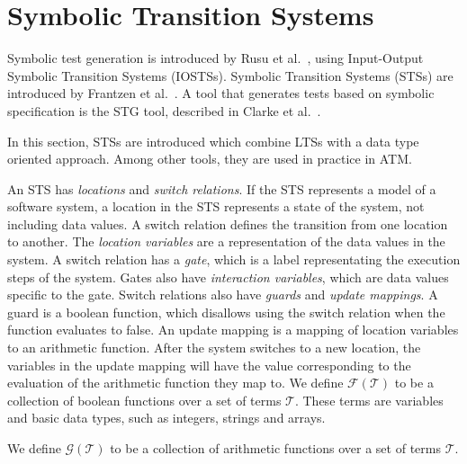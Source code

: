 \section{Symbolic Transition Systems}\label{sec:symbolic}
Symbolic test generation is introduced by Rusu et al.~\cite{rusu:symbolic}, using Input-Output Symbolic Transition Systems (IOSTSs). Symbolic Transition Systems (STSs) are introduced by Frantzen et al.~\cite{Frantzen:Symbolic}. A tool that generates tests based on symbolic specification is the STG tool, described in Clarke et al.~\cite{clarke:STG}.

In this section, STSs are introduced which combine LTSs with a data type oriented approach. Among other tools, they are used in practice in ATM.

An STS has \textit{locations} and \textit{switch relations}. If the STS represents a model of a software system, a location in the STS represents a state of the system, not including data values. A switch relation defines the transition from one location to another. The \textit{location variables} are a representation of the data values in the system. A switch relation has a \textit{gate}, which is a label representating the execution steps of the system. Gates also have \textit{interaction variables}, which are data values specific to the gate. Switch relations also have \textit{guards} and \textit{update mappings}. A guard is a boolean function, which disallows using the switch relation when the function evaluates to false. An update mapping is a mapping of location variables to an arithmetic function. After the system switches to a new location, the variables in the update mapping will have the value corresponding to the evaluation of the arithmetic function they map to. We define $\mathcal{F}(\mathcal{T})$ to be a collection of boolean functions over a set of terms $\mathcal{T}$. These terms are variables and basic data types, such as integers, strings and arrays. 

We define $\mathcal{G}(\mathcal{T})$ to be a collection of arithmetic functions over a set of terms $\mathcal{T}$.

